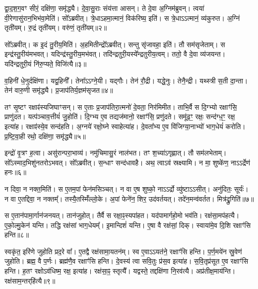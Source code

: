 द्वा॒द॒श॒ग॒वꣳ सीरं॒ दक्षि॑णा॒ समृ॑द्ध्यै।
दे॒वा॒सु॒राः संय॑त्ता आसन्।
ते दे॒वा अ॒ग्निम॑ब्रुवन्।
त्वया॑ वी॒रेणासु॑रान॒भिभ॑वा॒मेति॑।
सो᳚ऽब्रवीत्।
त्रे॒धा\-ऽहमा॒त्मानं॒ विक॑रिष्य॒ इति॑।
स त्रे॒धा\-ऽऽत्मानं॒ व्य॑कुरुत।
अ॒ग्निं तृती॑यम्।
रु॒द्रं तृती॑यम्।
वरु॑णं॒ तृती॑यम्॥२॥

सो᳚ऽब्रवीत्।
क इ॒दं तु॒रीय॒मिति॑।
अ॒हमितीन्द्रो᳚\-ऽब्रवीत्।
सन्तु सृ॑जावहा॒ इति॑।
तौ सम॑सृजेताम्।
स इन्द्र॑स्तु॒रीय॑मभवत्।
यदिन्द्र॑स्तु॒रीय॒मभ॑वत्।
तदि॑न्द्र\-तुरी॒यस्ये᳚न्द्र\-तुरीय॒त्वम्।
ततो॒ वै दे॒वा व्य॑जयन्त।
यदि॑न्द्रतुरी॒यं नि॑रु॒प्यते॒ विजि॑त्यै॥३॥

व॒हिनी॑ धे॒नुर्दक्षि॑णा।
यद्व॒हिनी᳚।
तेना᳚ऽऽग्ने॒यी।
यद्गौः।
तेन॑ रौ॒द्री।
यद्धे॒नुः।
तेनै॒न्द्री।
यथ्स्त्री स॒ती दा॒न्ता।
तेन॑ वारु॒णी समृ॑द्ध्यै।
प्र॒जा\-प॑तिर्य॒ज्ञम॑\-सृजत॥४॥

तꣳ सृ॒ष्टꣳ रक्षाꣴ॑स्यजिघाꣳसन्।
स ए॒ताः प्र॒जा\-प॑तिरा॒त्मनो॑ दे॒वता॒ निर॑मिमीत।
ताभि॒र्वै स दि॒ग्भ्यो रक्षाꣳ॑सि॒ प्राणु॑दत।
यत्प॑ञ्चाव॒त्तीयं॑ जु॒होति॑।
दि॒ग्भ्य ए॒व तद्यज॑मानो॒ रक्षाꣳ॑सि॒ प्रणु॑दते।
समू॑ढ॒ꣳ॒ रक्षः॒ सन्द॑ग्ध॒ꣳ॒ रक्ष॒ इत्या॑ह।
रक्षाꣴ॑स्ये॒व सन्द॑हति।
अ॒ग्नये॑ रक्षो॒घ्ने स्वाहेत्या॑ह।
दे॒वता᳚भ्य ए॒व वि॑जिग्या॒नाभ्यो॑ भाग॒धेयं॑ करोति।
प्र॒ष्टि॒वा॒ही रथो॒ दक्षि॑णा॒ समृ॑द्ध्यै॥५॥

इन्द्रो॑ वृ॒त्रꣳ ह॒त्वा।
असु॑रान्परा॒भाव्य॑।
नमु॑चिमासु॒रं नाल॑भत।
तꣳ श॒च्या॑\-ऽगृह्णात्।
तौ सम॑लभेताम्।
सो᳚ऽस्माद॒भिशु॑नतरो\-ऽभवत्।
सो᳚ऽब्रवीत्।
स॒न्धाꣳ सन्द॑धावहै।
अथ॒ त्वाऽव॑ स्रक्ष्यामि।
न मा॒ शुष्के॑ण॒ नाऽऽर्द्रेण॑ हनः॥६॥

न दिवा॒ न नक्त॒मिति॑।
स ए॒तम॒पां फेन॑मसिञ्चत्।
न वा ए॒ष शुष्को॒ नाऽऽर्द्रो व्यु॑ष्टा\-ऽऽसीत्।
अनु॑दितः॒ सूर्यः॑।
न वा ए॒तद्दिवा॒ न नक्तम्᳚।
तस्यै॒तस्मिँ॑ल्लो॒के।
अ॒पां फेने॑न॒ शिर॒ उद॑वर्तयत्।
तदे॑न॒मन्व॑वर्तत।
मित्र॑द्रु॒गिति॑॥७॥

स ए॒तान॑पामा॒र्गान॑जनयत्।
तान॑जुहोत्।
तैर्वै स रक्षा॒ꣴ॒स्यपा॑हत।
यद॑पामार्गहो॒मो भव॑ति।
रक्ष॑सा॒मप॑हत्यै।
ए॒को॒ल्मु॒केन॑ यन्ति।
तद्धि रक्ष॑सां भाग॒धेयम्᳚।
इ॒मान्दिशं॑ यन्ति।
ए॒षा वै रक्ष॑सां॒ दिक्।
स्वाया॑मे॒व दि॒शि रक्षाꣳ॑सि हन्ति॥८॥

स्वकृ॑त॒ इरि॑णे जुहोति प्रद॒रे वा᳚।
ए॒तद्वै रक्ष॑सामा॒यतन॑म्।
स्व ए॒वाऽऽयत॑ने॒ रक्षाꣳ॑सि हन्ति।
प॒र्ण॒मये॑न स्रु॒वेण॑ जुहोति।
ब्रह्म॒ वै प॒र्णः।
ब्रह्म॑णै॒व रक्षाꣳ॑सि हन्ति।
दे॒वस्य॑ त्वा सवि॒तुः प्र॑स॒व इत्या॑ह।
स॒वि॒तृप्र॑सूत ए॒व रक्षाꣳ॑सि हन्ति।
ह॒तꣳ रक्षो\-ऽव॑धिष्म॒ रक्ष॒ इत्या॑ह।
रक्ष॑सा॒ꣴ॒ स्तृत्यै᳚।
यद्वस्ते॒ तद्दक्षि॑णा नि॒रव॑त्यै।
अप्र॑तीक्ष॒माय॑न्ति।
रक्ष॑साम॒न्तर्‌\mbox{}हि॑त्यै॥९॥\anuvakamend[य॒च्छ॒ति॒ वरु॑णं॒ तृती॑यं॒ विजि॑त्या अ\-सृजत॒ समृ॑द्ध्यै हनो॒ मित्र॑द्रु॒गिति॑ हन्ति॒ स्तृत्यै॒ त्रीणि॑ च]

